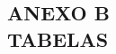 \clearpage
\vspace*{\fill}
\begin{center}
    \section*{ANEXO B \\ TABELAS}
\end{center}
\vspace*{\fill}
\clearpage
\newpage



